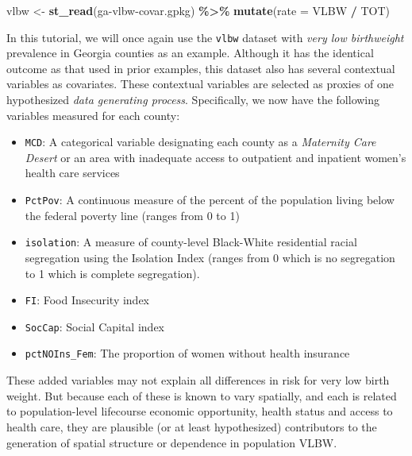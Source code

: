 \documentclass[
]{book}
\newenvironment{Shaded}{\begin{snugshade}}{\end{snugshade}}
\newcommand{\AttributeTok}[1]{\textcolor[rgb]{0.13,0.29,0.53}{#1}}
\newcommand{\FunctionTok}[1]{\textcolor[rgb]{0.13,0.29,0.53}{\textbf{#1}}}
\newcommand{\NormalTok}[1]{#1}
\newcommand{\OtherTok}[1]{\textcolor[rgb]{0.56,0.35,0.01}{#1}}
\newcommand{\SpecialCharTok}[1]{\textcolor[rgb]{0.81,0.36,0.00}{\textbf{#1}}}
\newcommand{\StringTok}[1]{\textcolor[rgb]{0.31,0.60,0.02}{#1}}
\providecommand{\tightlist}{%
  \setlength{\itemsep}{0pt}\setlength{\parskip}{0pt}}
\begin{document}
\begin{Shaded}
\begin{Highlighting}[]
\NormalTok{vlbw }\OtherTok{\textless{}{-}} \FunctionTok{st\_read}\NormalTok{(}\StringTok{\textquotesingle{}ga{-}vlbw{-}covar.gpkg\textquotesingle{}}\NormalTok{)  }\SpecialCharTok{\%\textgreater{}\%}
  \FunctionTok{mutate}\NormalTok{(}\AttributeTok{rate =}\NormalTok{ VLBW }\SpecialCharTok{/}\NormalTok{ TOT)}
\end{Highlighting}
\end{Shaded}

In this tutorial, we will once again use the \texttt{vlbw} dataset with \emph{very low birthweight} prevalence in Georgia counties as an example. Although it has the identical outcome as that used in prior examples, this dataset also has several contextual variables as covariates. These contextual variables are selected as proxies of one hypothesized \emph{data generating process}. Specifically, we now have the following variables measured for each county:

\begin{itemize}
\tightlist
\item
  \texttt{MCD}: A categorical variable designating each county as a \emph{Maternity Care Desert} or an area with inadequate access to outpatient and inpatient women's health care services
\item
  \texttt{PctPov}: A continuous measure of the percent of the population living below the federal poverty line (ranges from 0 to 1)
\item
  \texttt{isolation}: A measure of county-level Black-White residential racial segregation using the Isolation Index (ranges from 0 which is no segregation to 1 which is complete segregation).
\item
  \texttt{FI}: Food Insecurity index
\item
  \texttt{SocCap}: Social Capital index
\item
  \texttt{pctNOIns\_Fem}: The proportion of women without health insurance
\end{itemize}

These added variables may not explain all differences in risk for very low birth weight. But because each of these is known to vary spatially, and each is related to population-level lifecourse economic opportunity, health status and access to health care, they are plausible (or at least hypothesized) contributors to the generation of spatial structure or dependence in population VLBW.
\end{document}
